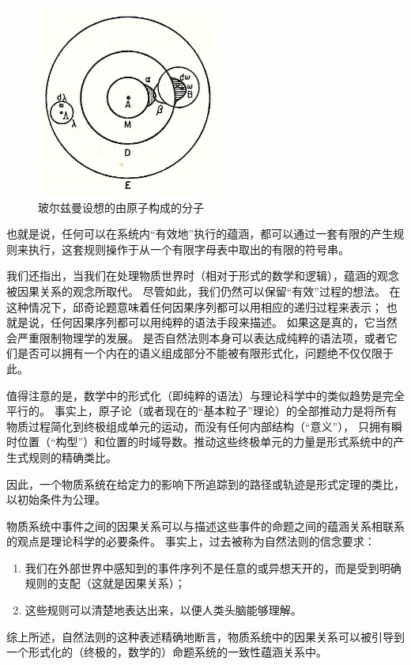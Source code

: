 \documentclass[a4paper,12pt]{article}
\begin{document}
\begin{figure}[ht]
\centering
\includegraphics[height=2.5in]{images/boltzmanns_molecule.jpg}
\caption{玻尔兹曼设想的由原子构成的分子}
\end{figure}

也就是说，任何可以在系统内“有效地”执行的蕴涵，都可以通过一套有限的产生规则来执行，这套规则操作于从一个有限字母表中取出的有限的符号串。

我们还指出，当我们在处理物质世界时（相对于形式的数学和逻辑），蕴涵的观念被因果关系的观念所取代。
尽管如此，我们仍然可以保留“有效”过程的想法。 在这种情况下，邱奇论题意味着任何因果序列都可以用相应的递归过程来表示；
也就是说，任何因果序列都可以用纯粹的语法手段来描述。 如果这是真的，它当然会严重限制物理学的发展。
是否自然法则本身可以表达成纯粹的语法项，或者它们是否可以拥有一个内在的语义组成部分不能被有限形式化，问题绝不仅仅限于此。

值得注意的是，数学中的形式化（即纯粹的语法）与理论科学中的类似趋势是完全平行的。
事实上，原子论（或者现在的“基本粒子”理论）的全部推动力是将所有物质过程简化到终极组成单元的运动，而没有任何内部结构（“意义”），
只拥有瞬时位置（“构型”）和位置的时域导数。推动这些终极单元的力量是形式系统中的产生式规则的精确类比。

因此，一个物质系统在给定力的影响下所追踪到的路径或轨迹是形式定理的类比，以初始条件为公理。

物质系统中事件之间的因果关系可以与描述这些事件的命题之间的蕴涵关系相联系的观点是理论科学的必要条件。
事实上，过去被称为自然法则的信念要求：
\begin{enumerate}[label=(\alph*)]
\item 我们在外部世界中感知到的事件序列不是任意的或异想天开的，而是受到明确规则的支配（这就是因果关系）；
\item 这些规则可以清楚地表达出来，以便人类头脑能够理解。
\end{enumerate}
综上所述，自然法则的这种表述精确地断言，物质系统中的因果关系可以被引导到一个形式化的（终极的，数学的）命题系统的一致性蕴涵关系中。
\end{document}
